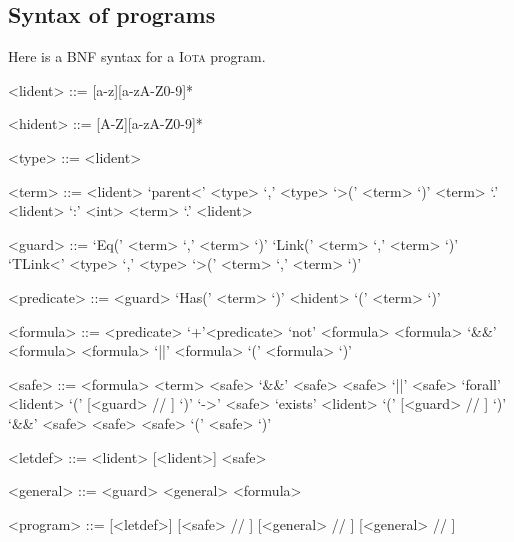 \documentclass[10pt,a4paper]{article}
\newcommand\Iota{\textsc{Iota}}
\begin{document}
\subsection{Syntax of programs}
\label{subsec:syntaxprog} Here is a BNF syntax for a \Iota{} program.
\begin{grammar}
  <lident> ::= [a-z][a-zA-Z0-9]*

  <hident> ::= [A-Z][a-zA-Z0-9]*

  <type> ::= <lident>

  <term> ::= <lident>
  \alt `parent<' <type> `,' <type> `>(' <term> `)'
  \alt <term> `.' <lident> `:' <int>
  \alt <term> `.' <lident>

  <guard> ::= `Eq(' <term> `,' <term> `)'
  \alt `Link(' <term> `,' <term> `)'
  \alt `TLink<' <type> `,' <type> `>(' <term> `,' <term> `)'

  <predicate> ::= <guard>
  \alt `Has(' <term> `)'
  \alt <hident> `(' <term> `)'

  <formula> ::= <predicate>
  \alt `+'<predicate>
  \alt `not' <formula>
  \alt <formula> `&&' <formula>
  \alt <formula> `||' <formula>
  \alt `(' <formula> `)'

  <safe> ::= <formula>
  \alt <term>
  \alt <safe> `&&' <safe>
  \alt <safe> `||' <safe>
  \alt `forall' <lident> `(' [<guard> // \lit{||}] `)' `->' <safe>
  \alt `exists' <lident> `(' [<guard> // \lit{||}] `)' `&&' <safe>
  \alt <safe> <safe>
  \alt `(' <safe> `)'

  <letdef> ::=  <lident> [<lident>] \lit{=} <safe>

  <general> ::=
  <guard> \lit{->} <general>
  \alt \lit{=>} <formula>

  <program> ::=
  [<letdef>]  [<safe> // \lit{;}]  [<general> // \lit{;}]  [<general> // \lit{;}]

\end{grammar}



\end{document}
